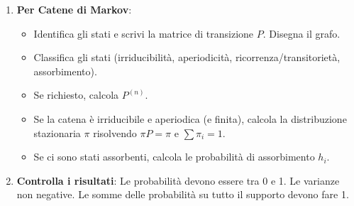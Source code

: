 \begin{enumerate}
    \item \textbf{Per Catene di Markov}:
        \begin{itemize}
            \item Identifica gli stati e scrivi la matrice di transizione $P$. Disegna il grafo.
            \item Classifica gli stati (irriducibilità, aperiodicità, ricorrenza/transitorietà, assorbimento).
            \item Se richiesto, calcola $P^{(n)}$.
            \item Se la catena è irriducibile e aperiodica (e finita), calcola la distribuzione stazionaria $\pi$ risolvendo $\pi P = \pi$ e $\sum \pi_i = 1$.
            \item Se ci sono stati assorbenti, calcola le probabilità di assorbimento $h_i$.
        \end{itemize}
    \item \textbf{Controlla i risultati}: Le probabilità devono essere tra 0 e 1. Le varianze non negative. Le somme delle probabilità su tutto il supporto devono fare 1.
\end{enumerate}